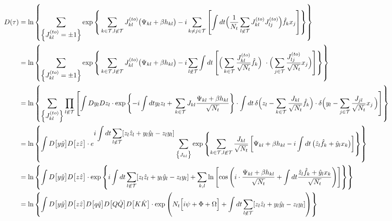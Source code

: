 \documentclass[%
 reprint,
superscriptaddress,
 amsmath,amssymb,
 prl,
]{revtex4-2}
\begin{document}
\begin{align} \nonumber
    D(\tau) &= \ln\left\{ \sum_{\displaystyle \Big\{J^{(to)}_{kl} = \pm 1\Big\}}    \exp\left\{\displaystyle \,\sum_{k\in \mathcal{T},    l\centernot \in \mathcal{T} } J^{(to)}_{kl} \big(\Psi_{kl}+ \beta h_{kl}\big)  -i \sum_{k\neq j \in \mathcal{T}}\left[\int dt \Big(\frac{1}{N_t}\sum_{ l\centernot \in \mathcal{T}} J_{kl}^{(to)}J_{lj}^{(to)}  \Big) \hat{f}_k x_j\right] \right\}\right\} 
   \\ \nonumber
   &= \ln\left\{ \sum_{\displaystyle \Big\{J^{(to)}_{kl} = \pm 1\Big\}}    \exp\left\{\displaystyle \,\sum_{k\in \mathcal{T},    l\centernot \in \mathcal{T} } J^{(to)}_{kl} \big(\Psi_{kl}+ \beta h_{kl}\big)  -i \sum_{ l\centernot \in \mathcal{T}} \int dt \left[ \Big(\sum_{k \in \mathcal{T}} \frac{J_{kl}^{(to)}}{\sqrt{N_t}} \hat{f}_k \Big) \ \cdot \Big(\sum_{j \in \mathcal{T}} \frac{J_{lj}^{(to)} }{\sqrt{N_t}}x_j \Big)  \right] \right\}\right\} \\ \nonumber
   &= \ln\left\{\sum_{\displaystyle \Big\{J^{(to)}_{kl} \Big\}}   \prod_{l\centernot \in \mathcal{T}} \left[\int Dy_l Dz_l\cdot \exp\left\{\displaystyle -i \int dt y_lz_l + \,\sum_{k\in \mathcal{T}} J_{kl}\frac{\Psi_{kl}+ \beta h_{kl}}{\sqrt{N_t}}\right\} \cdot \int dt \, \delta\Big(z_l- \sum_{k\in \mathcal{T}} \frac{J_{kl}}{\sqrt{N_t}} \hat{f}_k\Big) \cdot \delta\Big(y_l- \sum_{j\in \mathcal{T}} \frac{J_{jl}}{\sqrt{N_t}}x_j\, \Big)     \right]\right\} 
  \\\nonumber &= \ln\left\{\int D\big[y\hat{y}\big] D\big[z\hat{z}\big]\cdot e^{\displaystyle i\int dt\sum_{l\centernot \in \mathcal{T}}[z_l\hat{z}_l + y_l\hat{y}_l-z_ly_l ]}    \sum_{\big\{J_{kl}\big\}} \exp\left\{\sum_{k\in \mathcal{T}, l\centernot \in \mathcal{T}} \frac{J_{kl} }{\sqrt{N_t}} \left[\Psi_{kl}+ \beta h_{kl}-i \int dt \, \big(\hat{z}_l \hat{f}_k + \hat{y}_lx_k\big)\right]\right\} \right\} \\ \nonumber &= \ln\left\{\int D\big[y\hat{y}\big] D\big[z\hat{z}\big]\cdot \exp\left\{\displaystyle i\int dt\sum_{l\centernot \in \mathcal{T}}[z_l\hat{z}_l + y_l\hat{y}_l-z_ly_l ]     +\sum_{k,l} \ln\left[ {\rm cos}\left( i \cdot \frac{\Psi_{kl}+ \beta h_{kl}}{\sqrt{N_t}}   +  \int dt \frac{\hat{z}_l\hat{f}_k +\hat{y}_lx_k}{\sqrt{N_t}}  \right)     \right]\right\}\right\} \\  &= \ln\left\{\int D\big[y\hat{y}\big] D\big[z\hat{z}\big] D\big[q\hat{q}\big] D\big[Q\hat{Q}\big]
    D\big[K\hat{K}\big]\cdot \exp\left(N_t\Big[ \displaystyle  i\psi +  \Phi +  \Omega \Big]  + \int dt\sum_{l\centernot \in \mathcal{T}}[z_l\hat{z}_l + y_l\hat{y}_l-z_ly_l]\right)\right\} 
\end{align}
\end{document}
